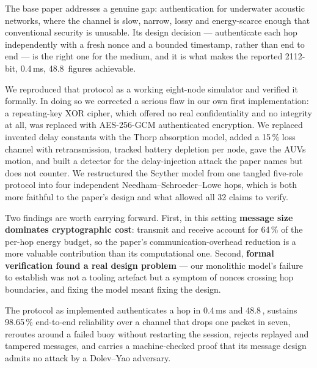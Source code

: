 The base paper addresses a genuine gap: authentication for underwater acoustic networks,
where the channel is slow, narrow, lossy and energy-scarce enough that conventional security
is unusable. Its design decision --- authenticate each hop independently with a fresh nonce
and a bounded timestamp, rather than end to end --- is the right one for the medium, and it
is what makes the reported 2112-bit, 0.4\,ms, 48.8\,\uJ{} figures achievable.

We reproduced that protocol as a working eight-node simulator and verified it formally. In
doing so we corrected a serious flaw in our own first implementation: a repeating-key XOR
cipher, which offered no real confidentiality and no integrity at all, was replaced with
AES-256-GCM authenticated encryption. We replaced invented delay constants with the Thorp
absorption model, added a 15\,\% loss channel with retransmission, tracked battery
depletion per node, gave the AUVs motion, and built a detector for the delay-injection
attack the paper names but does not counter. We restructured the Scyther model from one
tangled five-role protocol into four independent Needham--Schroeder--Lowe hops, which is
both more faithful to the paper's design and what allowed all 32 claims to verify.

Two findings are worth carrying forward. First, in this setting \textbf{message size
dominates cryptographic cost}: transmit and receive account for 64\,\% of the per-hop energy
budget, so the paper's communication-overhead reduction is a more valuable contribution than
its computational one. Second, \textbf{formal verification found a real design problem} ---
our monolithic model's failure to establish  was not a tooling artefact but a
symptom of nonces crossing hop boundaries, and fixing the model meant fixing the design.

The protocol as implemented authenticates a hop in 0.4\,ms and 48.8\,\uJ, sustains 98.65\,\%
end-to-end reliability over a channel that drops one packet in seven, reroutes around a
failed buoy without restarting the session, rejects replayed and tampered messages, and
carries a machine-checked proof that its message design admits no attack by a
Dolev--Yao adversary.
